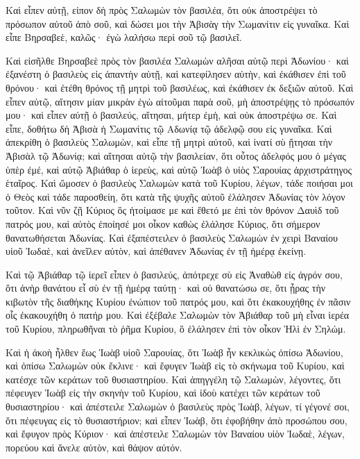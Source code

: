 {Καὶ εἶπεν αὐτῇ, εἰπον δὴ πρὸς Σαλωμὼν τὸν βασιλέα, ὅτι οὐκ ἀποστρέψει τὸ πρόσωπον αὐτοῦ ἀπὸ σοῦ, καὶ δώσει μοι τὴν Ἀβισὰγ τὴν Σωμανίτιν εἰς γυναῖκα.
Καὶ εἶπε Βηρσαβεὲ, καλῶς· ἐγὼ λαλήσω περὶ σοῦ τῷ βασιλεῖ.
\par }{\PP {}Καὶ εἰσῆλθε Βηρσαβεὲ πρὸς τὸν βασιλέα Σαλωμὼν αλῆσαι αὐτῷ περὶ Ἀδωνίου· καὶ ἐξανέστη ὁ βασιλεὺς εἰς ἀπαντὴν αὐτῇ, καὶ κατεφίλησεν αὐτὴν, καὶ ἐκάθισεν ἐπὶ τοῦ θρόνου· καὶ ἐτέθη θρόνος τῇ μητρὶ τοῦ βασιλέως, καὶ ἐκάθισεν ἐκ δεξιῶν αὐτοῦ.
Καὶ εἶπεν αὐτῷ, αἴτησιν μίαν μικρὰν ἐγὼ αἰτοῦμαι παρὰ σοῦ, μὴ ἀποστρέψῃς τὸ πρόσωπόν μου· καὶ εἶπεν αὐτῇ ὁ βασιλεύς, αἴτησαι, μήτερ ἐμὴ, καὶ οὐκ ἀποστρέψω σε.
Καὶ εἶπε, δοθήτω δὴ Ἀβισὰ ἡ Σωμανίτις τῷ Αδωνίᾳ τῷ ἀδελφῷ σου εἰς γυναῖκα.
Καὶ ἀπεκρίθη ὁ βασιλεὺς Σαλωμὼν, καὶ εἶπε τῇ μητρὶ αὐτοῦ, καὶ ἱνατί σὺ ᾔτησαι τὴν Ἀβισὰλ τῷ Ἀδωνίᾳ; καὶ αἴτησαι αὐτῷ τὴν βασιλείαν, ὅτι οὗτος ἀδελφός μου ὁ μέγας ὑπὲρ ἐμέ, καὶ αὐτῷ Ἀβιάθαρ ὁ ἱερεὺς, καὶ αὐτῷ Ἰωὰβ ὁ υἱὸς Σαρουίας ἀρχιστράτηγος ἑταῖρος.
Καὶ ὤμοσεν ὁ βασιλεὺς Σαλωμὼν κατὰ τοῦ Κυρίου, λέγων, τάδε ποιήσαι μοι ὁ Θεὸς καὶ τάδε παροσθείη, ὅτι κατὰ τῆς ψυχῆς αὐτοῦ ἐλάλησεν Ἀδωνίας τὸν λόγον τοῦτον.
Καὶ νῦν ζῇ Κύριος ὃς ἡτοίμασε με καὶ ἔθετό με ἐπὶ τὸν θρόνον Δαυὶδ τοῦ πατρός μου, καὶ αὐτὸς ἐποίησέ μοι οἶκον καθὼς ἐλάλησε Κύριος, ὅτι σήμερον θανατωθήσεται Ἀδωνίας.
Καὶ ἐξαπέστειλεν ὁ βασιλεὺς Σαλωμὼν ἐν χειρὶ Βαναίου υἱοῦ Ἰωδαὲ, καὶ ἀνεῖλεν αὐτὸν, καὶ ἀπέθανεν Ἀδωνίας ἐν τῇ ἡμέρᾳ ἐκείνῃ.
\par }{\PP {}Καὶ τῷ Ἀβιάθαρ τῷ ἱερεῖ εἶπεν ὁ βασιλεύς, ἀπότρεχε σὺ εἰς Ἀναθὼθ εἰς ἀγρόν σου, ὅτι ἀνὴρ θανάτου εἶ σὺ ἐν τῇ ἡμέρᾳ ταύτῃ· καὶ οὐ θανατώσω σε, ὅτι ᾖρας τὴν κιβωτὸν τῆς διαθήκης Κυρίου ἐνώπιον τοῦ πατρός μου, καὶ ὅτι ἐκακουχήθης ἐν πᾶσιν οἷς ἐκακουχήθη ὁ πατήρ μου.
Καὶ ἐξέβαλε Σαλωμὼν τὸν Ἀβιάθαρ τοῦ μὴ εἶναι ἱερέα τοῦ Κυρίου, πληρωθῆναι τὸ ῥῆμα Κυρίου, ὃ ἐλάλησεν ἐπὶ τὸν οἶκον Ἡλὶ ἐν Σηλώμ.
\par }{\PP {}Καὶ ἡ ἀκοὴ ἦλθεν ἕως Ἰωὰβ υἱοῦ Σαρουίας, ὅτι Ἰωὰβ ἦν κεκλικὼς ὀπίσω Ἀδωνίου, καὶ ὀπίσω Σαλωμὼν οὐκ ἔκλινε· καὶ ἔφυγεν Ἰωὰβ εἰς τὸ σκήνωμα τοῦ Κυρίου, καὶ κατέσχε τῶν κεράτων τοῦ θυσιαστηρίου.
Καὶ ἀπηγγέλη τῷ Σαλωμὼν, λέγοντες, ὅτι πέφευγεν Ἰωὰβ εἰς τὴν σκηνὴν τοῦ Κυρίου, καὶ ἰδοὺ κατέχει τῶν κεράτων τοῦ θυσιαστηρίου· καὶ ἀπέστειλε Σαλωμὼν ὁ βασιλεὺς πρὸς Ἰωὰβ, λέγων, τί γέγονέ σοι, ὅτι πέφευγας εἰς τὸ θυσιαστήριον; καὶ εἶπεν Ἰωὰβ, ὅτι ἐφοβήθην ἀπὸ προσώπου σου, καὶ ἔφυγον πρὸς Κύριον· καὶ ἀπέστειλε Σαλωμὼν τὸν Βαναίου υἱὸν Ἰωδαὲ, λέγων, πορεύου καὶ ἄνελε αὐτὸν, καὶ θάψον αὐτόν.
}

